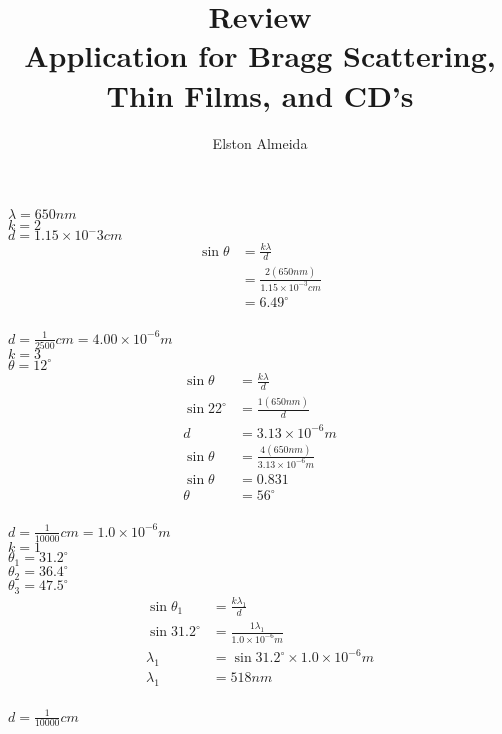\documentclass[12pt]{article}
\begin{document}
\title{\textbf{Review}\\ Application for Bragg Scattering, Thin Films, and CD's}
\author{Elston Almeida}

\maketitle
\vspace{2pc}

\noindent
$\lambda = 650nm$\\
$k = 2$ \\
$d = 1.15{\times}10^-3cm$\\

\begin{equation}
  \begin{split}
  \sin \theta & = \frac{k \lambda}{d} \\
  & = \frac{2(650nm)}{1.15{\times}10^{-3}cm } \\
  & = 6.49 ^\circ \\ 
  \end{split}
\end{equation}

\noindent
$d = \frac{1}{2500}cm = 4.00 \times 10^{-6}m$ \\ 
$k = 3$ \\ 
$\theta = 12^\circ$ \\

\begin{equation}
  \begin{split}
    \sin \theta & = \frac{k \lambda}{d} \\
    \sin 22^\circ & = \frac{1(650nm)}{d} \\
    d & = 3.13{\times}10^{-6}m \\
    \sin \theta & = \frac{4(650nm)}{3.13{\times}10^{-6}m } \\
    \sin \theta & = 0.831 \\
    \theta & = 56^\circ \\
  \end{split}
\end{equation}

\newpage

\noindent
$d = \frac{1}{10000}cm = 1.0{\times}10^{-6}m$\\
$k=1$\\
$\theta_1 = 31.2^\circ$\\
$\theta_2 = 36.4^\circ$\\
$\theta_3 = 47.5^\circ$\\

\begin{equation}
  \begin{split}
    \sin \theta_1 & = \frac{k \lambda_1}{d} \\
    \sin 31.2^\circ & = \frac{1 \lambda_1}{1.0{\times}10^{-6}m} \\
    \lambda_1 & = \sin 31.2^\circ{\times}1.0{\times}10^{-6}m \\
    \lambda_1 & = 518nm \\
  \end{split}
\end{equation}


\noindent
$d=\frac{1}{10000}cm$
\end{document}
